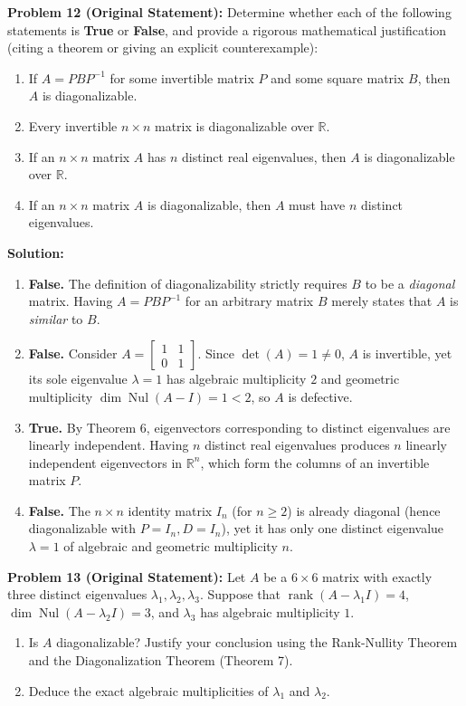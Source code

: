 \documentclass[11pt, letterpaper]{article}
\theoremstyle{definition}
\theoremstyle{remark}
\begin{document}
\textbf{Problem 12 (Original Statement):}
Determine whether each of the following statements is \textbf{True} or \textbf{False}, and provide a rigorous mathematical justification (citing a theorem or giving an explicit counterexample):
\begin{enumerate}[label=(\alph*)]
    \item If $A = PBP^{-1}$ for some invertible matrix $P$ and some square matrix $B$, then $A$ is diagonalizable.
    \item Every invertible $n \times n$ matrix is diagonalizable over $\mathbb{R}$.
    \item If an $n \times n$ matrix $A$ has $n$ distinct real eigenvalues, then $A$ is diagonalizable over $\mathbb{R}$.
    \item If an $n \times n$ matrix $A$ is diagonalizable, then $A$ must have $n$ distinct eigenvalues.
\end{enumerate}

\textbf{Solution:}
\begin{enumerate}[label=(\alph*)]
    \item \textbf{False.} The definition of diagonalizability strictly requires $B$ to be a \emph{diagonal} matrix. Having $A = PBP^{-1}$ for an arbitrary matrix $B$ merely states that $A$ is \emph{similar} to $B$.
    \item \textbf{False.} Consider $A = \begin{bmatrix} 1 & 1 \\ 0 & 1 \end{bmatrix}$. Since $\det(A) = 1 \neq 0$, $A$ is invertible, yet its sole eigenvalue $\lambda = 1$ has algebraic multiplicity $2$ and geometric multiplicity $\dim\operatorname{Nul}(A - I) = 1 < 2$, so $A$ is defective.
    \item \textbf{True.} By Theorem 6, eigenvectors corresponding to distinct eigenvalues are linearly independent. Having $n$ distinct real eigenvalues produces $n$ linearly independent eigenvectors in $\mathbb{R}^{n}$, which form the columns of an invertible matrix $P$.
    \item \textbf{False.} The $n \times n$ identity matrix $I_{n}$ (for $n \ge 2$) is already diagonal (hence diagonalizable with $P = I_{n}, D = I_{n}$), yet it has only one distinct eigenvalue $\lambda = 1$ of algebraic and geometric multiplicity $n$.
\end{enumerate}

\vspace{0.8em}
\textbf{Problem 13 (Original Statement):}
Let $A$ be a $6 \times 6$ matrix with exactly three distinct eigenvalues $\lambda_1, \lambda_2, \lambda_3$. Suppose that $\operatorname{rank}(A - \lambda_1 I) = 4$, $\dim\operatorname{Nul}(A - \lambda_2 I) = 3$, and $\lambda_3$ has algebraic multiplicity $1$.
\begin{enumerate}[label=(\alph*)]
    \item Is $A$ diagonalizable? Justify your conclusion using the Rank-Nullity Theorem and the Diagonalization Theorem (Theorem 7).
    \item Deduce the exact algebraic multiplicities of $\lambda_1$ and $\lambda_2$.
\end{enumerate}
\end{document}
